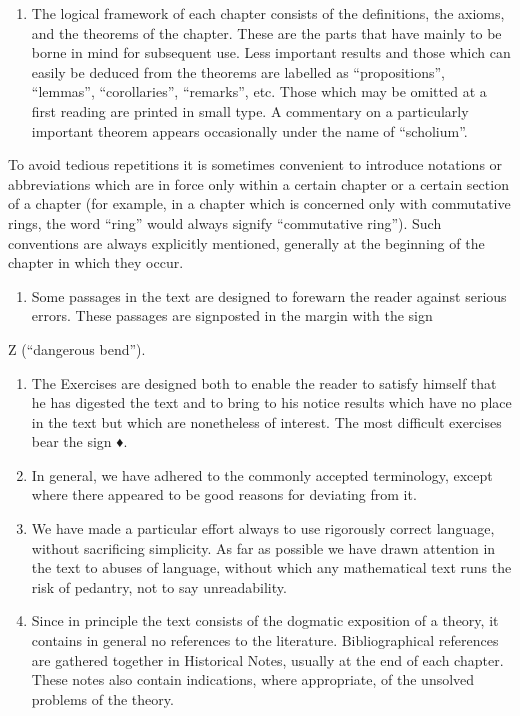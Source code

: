 \begin{enumerate}
\item
  The logical framework of each chapter consists of the definitions, the axioms, and the theorems of the chapter. These are the parts that have mainly to be borne in mind for subsequent use. Less important results and those which can easily be deduced from the theorems are labelled as ``propositions'', ``lemmas'', ``corollaries'', ``remarks'', etc. Those which may be omitted at a first reading are printed in small type. A commentary on a particularly important theorem appears occasionally under the name of ``scholium''.
\end{enumerate}

To avoid tedious repetitions it is sometimes convenient to introduce notations or abbreviations which are in force only within a certain chapter or a certain section of a chapter (for example, in a chapter which is concerned only with commutative rings, the word ``ring'' would always signify ``commutative ring''). Such conventions are always explicitly mentioned, generally at the beginning of the chapter in which they occur.

\begin{enumerate}
\def\labelenumi{\arabic{enumi}.}
\setcounter{enumi}{5}
\tightlist
\item
  Some passages in the text are designed to forewarn the reader against serious errors. These passages are signposted in the margin with the sign
\end{enumerate}

Z (``dangerous bend'').

\begin{enumerate}
\def\labelenumi{\arabic{enumi}.}
\setcounter{enumi}{6}
\item
  The Exercises are designed both to enable the reader to satisfy himself that he has digested the text and to bring to his notice results which have no place in the text but which are nonetheless of interest. The most difficult exercises bear the sign ♦.
\item
  In general, we have adhered to the commonly accepted terminology, except where there appeared to be good reasons for deviating from it.
\item
  We have made a particular effort always to use rigorously correct language, without sacrificing simplicity. As far as possible we have drawn attention in the text to abuses of language, without which any mathematical text runs the risk of pedantry, not to say unreadability.
\item
  Since in principle the text consists of the dogmatic exposition of a theory, it contains in general no references to the literature. Bibliographical references are gathered together in Historical Notes, usually at the end of each chapter. These notes also contain indications, where appropriate, of the unsolved problems of the theory.
\end{enumerate}

